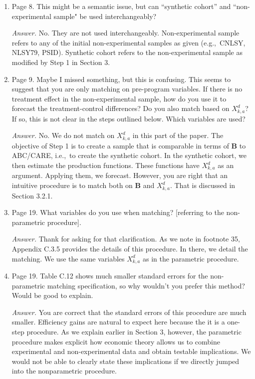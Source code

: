 \begin{enumerate}

\item Page 8. This might be a semantic issue, but can ``synthetic cohort'' and ``non-experimental sample" be used interchangeably?

\noindent \textit{Answer.} No. They are not used interchangeably. Non-experimental sample refers to any of the initial non-experimental samples as given (e.g.,\ CNLSY, NLSY79, PSID). Synthetic cohort refers to the non-experimental sample as modified by Step 1 in Section 3.

\item Page 9. Maybe I missed something, but this is confusing. This seems to suggest that you are only matching on pre-program variables. If there is no treatment effect in the non-experimental sample, how do you use it to forecast the treatment-control differences? Do you also match based on $X^d_{k,a}$? If so, this is not clear in the steps outlined below. Which variables are used?

\noindent \textit{Answer.} No. We do not match on $X^d_{k,a}$ in this part of the paper. The objective of Step 1 is to create a sample that is comparable in terms of $\bm{B}$ to ABC/CARE, i.e.,\ to create the synthetic cohort. In the synthetic cohort, we then estimate the production functions. These functions have $X^d_{k,a}$ as an argument. Applying them, we forecast. However, you are right that an intuitive procedure is to match both on  $\bm{B}$ and $X^d_{k,a}$. That is discussed in Section 3.2.1.

\item Page 19. What variables do you use when matching? [referring to the non-parametric procedure]. 

\noindent \textit{Answer.} Thank for asking for that clarification. As we note in footnote 35, Appendix C.3.5 provides the details of this procedure. In there, we detail the matching. We use the same variables  $X^d_{k,a}$ as in the parametric procedure.

\item Page 19. Table C.12 shows much smaller standard errors for the non-parametric matching specification, so why wouldn't you prefer this method? Would be good to explain.

\noindent \textit{Answer.} You are correct that the standard errors of this procedure are much smaller. Efficiency gains are natural to expect here because the it is a one-step procedure. As we explain earlier in Section 3, however, the parametric procedure makes explicit how economic theory allows us to combine experimental and non-experimental data and obtain testable implications. We would not be able to clearly state these implications if we directly jumped into the nonparametric procedure. 


\end{enumerate}
